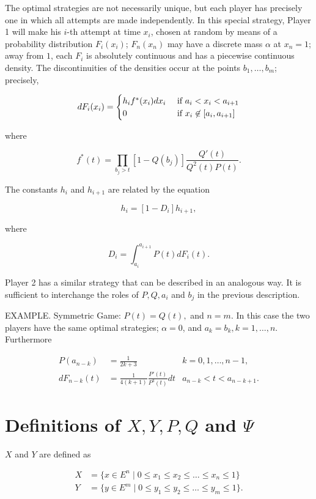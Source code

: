 \documentclass{article}
\theoremstyle{remark}
\begin{document}
The optimal strategies are not necessarily unique, but each player has
precisely one in which all attempts are made independently. In this special
strategy, Player 1 will make his $i$-th attempt at time $x_i$, chosen at random
by means of a probability distribution $F_i(x_i)$; $F_n(x_n)$ may have a
discrete mass $\alpha$ at $x_n = 1$; away from $1$, each $F_i$ is absolutely
continuous and has a piecewise continuous density. The discontinuities of the
densities occur at the points $b_1, \dots, b_m$; precisely,

\[
dF_i(x_i) = \begin{cases}
h_i f^*(x_i) dx_i & \textup{ if } a_i < x_i < a_{i+1} \\
0                 & \textup{ if } x_i \not \in [a_i, a_{i+1}] \\
\end{cases}
\]

where

\[
f^*(t) = \prod_{b_j > t} \left [ 1 - Q(b_j) \right ] \frac{Q'(t)}{Q^2(t) P(t)}.
\]

The constants $h_i$ and $h_{i+1}$ are related by the equation

\[
h_i = [1 - D_i] h_{i+1},
\]

where

\[
D_i = \int_{a_i}^{a_{i+1}} P(t) dF_i(t).
\]

Player 2 has a similar strategy that can be described in an analogous way. It
is sufficient to interchange the roles of $P, Q, a_i$ and $b_j$ in the previous
description.

EXAMPLE. Symmetric Game: $P(t) = Q(t),$ and $n = m$. In this case the two
players have the same optimal strategies; $\alpha = 0$, and $a_k = b_k, k=1,
\dots, n$. Furthermore

\[
\begin{aligned}
P(a_{n-k}) &= \frac{1}{2k+3} & k = 0, 1, \dots, n-1, \\
dF_{n-k}(t) &= \frac{1}{4(k+1)} \frac{P'(t)}{P^3(t)} dt & a_{n-k} < t <
a_{n-k+1}.
\end{aligned}
\]

\section{Definitions of $X, Y, P, Q$ and $\Psi$}

$X$ and $Y$ are defined as

\[
\begin{aligned}
   X &= \{ x \in E^n \mid 0 \leq x_1 \leq x_2 \leq \dots \leq x_n \leq 1 \} \\
   Y &= \{ y \in E^m \mid 0 \leq y_1 \leq y_2 \leq \dots \leq y_m \leq 1 \}.
\end{aligned}
\]
\end{document}
